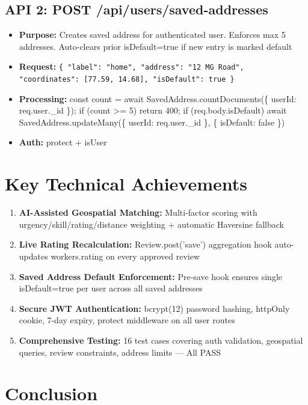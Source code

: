 \documentclass[12pt,a4paper]{article}
\begin{document}
\subsection*{API 2: POST /api/users/saved-addresses}
\begin{itemize}[leftmargin=*]
    \item \textbf{Purpose:} Creates saved address for authenticated user. Enforces max 5 addresses. Auto-clears prior isDefault=true if new entry is marked default
    \item \textbf{Request:} \texttt{\{ "label": "home", "address": "12 MG Road", "coordinates": [77.59, 14.68], "isDefault": true \}}
    \item \textbf{Processing:} const count = await SavedAddress.countDocuments(\{ userId: req.user.\_id \}); if (count >= 5) return 400; if (req.body.isDefault) await SavedAddress.updateMany(\{ userId: req.user.\_id \}, \{ isDefault: false \})
    \item \textbf{Auth:} protect + isUser
\end{itemize}

\section*{Key Technical Achievements}

\begin{enumerate}[leftmargin=*]
    \item \textbf{AI-Assisted Geospatial Matching:} Multi-factor scoring with urgency/skill/rating/distance weighting + automatic Haversine fallback
    \item \textbf{Live Rating Recalculation:} Review.post('save') aggregation hook auto-updates workers.rating on every approved review
    \item \textbf{Saved Address Default Enforcement:} Pre-save hook ensures single isDefault=true per user across all saved addresses
    \item \textbf{Secure JWT Authentication:} bcrypt(12) password hashing, httpOnly cookie, 7-day expiry, protect middleware on all user routes
    \item \textbf{Comprehensive Testing:} 16 test cases covering auth validation, geospatial queries, review constraints, address limits — All PASS
\end{enumerate}

\vspace{1cm}

\section*{Conclusion}
\end{document}
